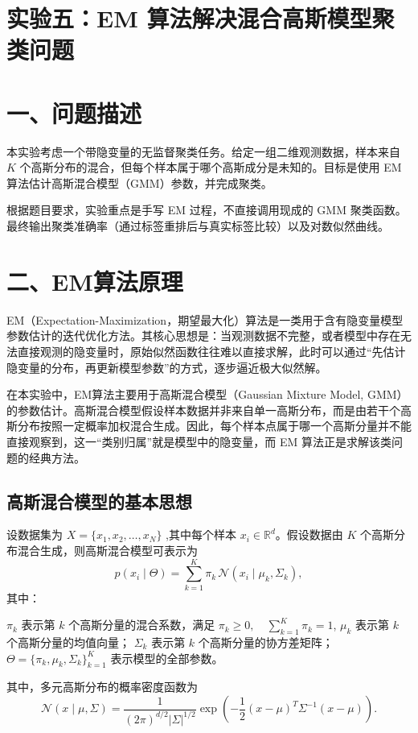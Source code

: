 \documentclass[12pt,a4paper]{ctexart}
\begin{document}
\section*{实验五：EM 算法解决混合高斯模型聚类问题}

\section*{一、问题描述}
本实验考虑一个带隐变量的无监督聚类任务。给定一组二维观测数据，样本来自 $K$ 个高斯分布的混合，但每个样本属于哪个高斯成分是未知的。目标是使用 EM 算法估计高斯混合模型（GMM）参数，并完成聚类。

根据题目要求，实验重点是手写 EM 过程，不直接调用现成的 GMM 聚类函数。最终输出聚类准确率（通过标签重排后与真实标签比较）以及对数似然曲线。

\section*{二、EM算法原理}

EM（Expectation-Maximization，期望最大化）算法是一类用于含有隐变量模型参数估计的迭代优化方法。其核心思想是：当观测数据不完整，或者模型中存在无法直接观测的隐变量时，原始似然函数往往难以直接求解，此时可以通过“先估计隐变量的分布，再更新模型参数”的方式，逐步逼近极大似然解。

在本实验中，EM算法主要用于高斯混合模型（Gaussian Mixture Model, GMM）的参数估计。高斯混合模型假设样本数据并非来自单一高斯分布，而是由若干个高斯分布按照一定概率加权混合生成。因此，每个样本点属于哪一个高斯分量并不能直接观察到，这一“类别归属”就是模型中的隐变量，而 EM 算法正是求解该类问题的经典方法。

\subsection*{高斯混合模型的基本思想}

设数据集为 $X=\{x_1,x_2,\dots,x_N\}$ ,其中每个样本 $x_i \in \mathbb{R}^d$。假设数据由 $K$ 个高斯分布混合生成，则高斯混合模型可表示为
\[
p(x_i \mid \Theta)=\sum_{k=1}^{K}\pi_k \,\mathcal{N}(x_i\mid \mu_k,\Sigma_k),
\]
其中：

$\pi_k$ 表示第 $k$ 个高斯分量的混合系数，满足 $\pi_k \ge 0,\quad \sum_{k=1}^{K}\pi_k=1$,  $\mu_k$ 表示第 $k$ 个高斯分量的均值向量； $\Sigma_k$ 表示第 $k$ 个高斯分量的协方差矩阵； $\Theta=\{\pi_k,\mu_k,\Sigma_k\}_{k=1}^{K}$ 表示模型的全部参数。

其中，多元高斯分布的概率密度函数为
\[
\mathcal{N}(x\mid \mu,\Sigma)=\frac{1}{(2\pi)^{d/2}|\Sigma|^{1/2}}
\exp\left(
-\frac{1}{2}(x-\mu)^T\Sigma^{-1}(x-\mu)
\right).
\]
\end{document}
